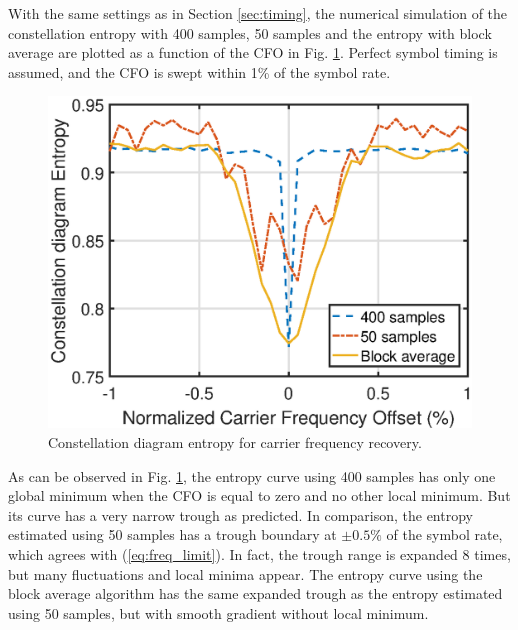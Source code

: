 \documentclass[journal,comsoc,onecolumn, 12pt,draftclsnofoot]{IEEEtran}
\begin{document}
With the same settings as in Section \ref{sec:timing}, the numerical simulation of the constellation entropy with 400 samples, 50 samples and the entropy with block average are plotted as a function of the CFO in Fig. \ref{fig:freq_entp}.
Perfect symbol timing is assumed, and the CFO is swept within 1\% of the symbol rate.



\begin{figure}[ht]
\centering
\includegraphics[width=3 in]{pic/freq.eps}
\caption{Constellation diagram entropy for carrier frequency recovery.}
\label{fig:freq_entp} 
\end{figure}   

As can be observed in Fig. \ref{fig:freq_entp}, the entropy curve using 400 samples has only one global minimum when the CFO is equal to zero and no other local minimum.
But its curve has a very narrow trough as predicted.
In comparison, the entropy estimated using 50 samples has a trough boundary at \(\pm 0.5\%\) of the symbol rate, which agrees with (\ref{eq:freq_limit}).
In fact, the trough range is expanded 8 times, but many fluctuations and local minima appear.
The entropy curve using the block average algorithm has the same expanded trough as the entropy estimated using 50 samples, but with smooth gradient without local minimum.
\end{document}
